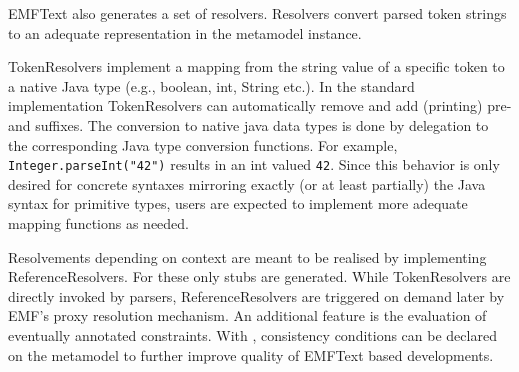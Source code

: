 EMFText also generates a set of resolvers. Resolvers convert parsed token
strings to an adequate representation in the metamodel instance.

TokenResolvers implement a mapping from the string value of a specific token to a native 
Java type (e.g., boolean, int, String etc.). In the standard implementation
TokenResolvers can automatically remove and add (printing) pre- and suffixes. The conversion to native 
java data types is done by delegation to the corresponding Java type conversion
functions. For example, \texttt{Integer.parseInt("42")} results in an int valued
\texttt{42}. Since this behavior is only desired for concrete syntaxes
mirroring exactly (or at least partially) the Java syntax for primitive types, users are 
expected to implement more adequate mapping functions as needed.  

Resolvements depending on context are meant to be realised by implementing
ReferenceResolvers. For these only stubs are generated. While TokenResolvers are directly invoked by parsers, 
ReferenceResolvers are triggered on demand later by EMF's proxy resolution mechanism. An 
additional feature is the evaluation of eventually annotated \OCL constraints.
With \OCL, consistency conditions can be declared on the metamodel to further
improve quality of EMFText based developments.

